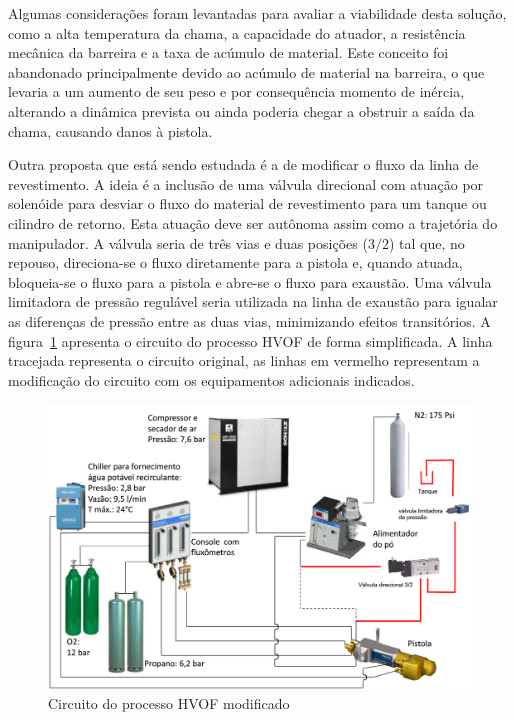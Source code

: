 Algumas considerações foram levantadas para avaliar a viabilidade
desta solução, como a alta temperatura da chama, a capacidade do atuador, a
resistência mecânica da barreira e a taxa de acúmulo de material. Este conceito
foi abandonado principalmente devido ao acúmulo de material na barreira, o que
levaria a um aumento de seu peso e por consequência momento de inércia,
alterando a dinâmica prevista ou ainda poderia chegar a obstruir a saída da
chama, causando danos à pistola.

Outra proposta que está sendo estudada é a de modificar o fluxo da linha de
revestimento. A ideia é a inclusão de uma válvula direcional com atuação por
solenóide para desviar o fluxo do material de revestimento para um tanque ou
cilindro de retorno. Esta atuação deve ser autônoma assim como a
trajetória do manipulador. A válvula seria de três vias e duas posições ($3/2$) tal que, no 
repouso, direciona-se o fluxo diretamente para a pistola e, quando
atuada, bloqueia-se o fluxo para a pistola e abre-se o fluxo para exaustão. Uma
válvula limitadora de pressão regulável seria utilizada na linha de exaustão
para igualar as diferenças de pressão entre as duas vias, minimizando efeitos transitórios.
A figura~\ref{fig::circuito_hvof} apresenta o circuito do processo HVOF de forma
simplificada.
A linha tracejada representa o circuito original, as linhas em vermelho
representam a modificação do circuito com os equipamentos adicionais indicados.

 \begin{figure}[h!]
   \centering
   \includegraphics[width=0.8\columnwidth]{figs/shutter/Circuito_HVOF_mod}
   \caption{Circuito do processo HVOF modificado}
   \label{fig::circuito_hvof}
\end{figure}